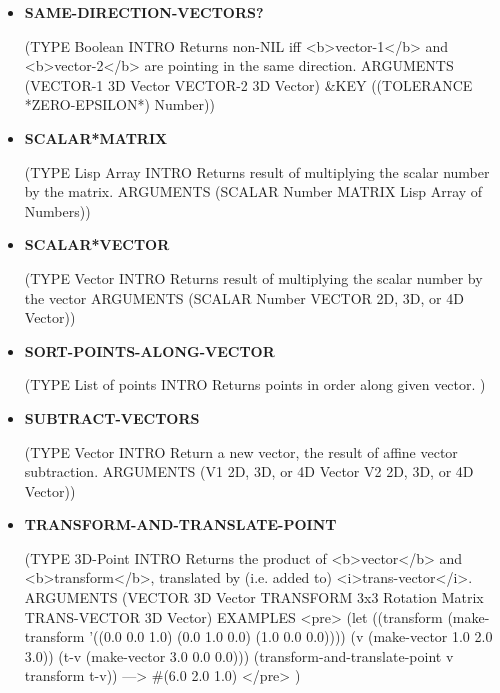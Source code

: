 \documentclass [11pt]{book}
\begin{document}
\begin{itemize}
\item {}
\label{prim:same-direction-vectors?}
\textbf{SAME-DIRECTION-VECTORS?}

(TYPE Boolean INTRO  Returns non-NIL iff <b>vector-1</b> and <b>vector-2</b> are pointing in the
same direction.
 ARGUMENTS (VECTOR-1 3D Vector VECTOR-2 3D Vector) \&KEY ((TOLERANCE *ZERO-EPSILON*) Number))



\item {}
\label{prim:scalar*matrix}
\textbf{SCALAR*MATRIX}

(TYPE Lisp Array INTRO  Returns result of multiplying the scalar number by the matrix.
 ARGUMENTS (SCALAR Number MATRIX Lisp Array of Numbers))



\item {}
\label{prim:scalar*vector}
\textbf{SCALAR*VECTOR}

(TYPE Vector INTRO  Returns result of multiplying the scalar number by the vector
 ARGUMENTS (SCALAR Number VECTOR 2D, 3D, or 4D Vector))



\item {}
\label{prim:sort-points-along-vector}
\textbf{SORT-POINTS-ALONG-VECTOR}

(TYPE List of points INTRO  Returns points in order along given vector.
)



\item {}
\label{prim:subtract-vectors}
\textbf{SUBTRACT-VECTORS}

(TYPE Vector INTRO  Return a new vector, the result of affine vector subtraction.
 ARGUMENTS (V1 2D, 3D, or 4D Vector V2 2D, 3D, or 4D Vector))



\item {}
\label{prim:transform-and-translate-point}
\textbf{TRANSFORM-AND-TRANSLATE-POINT}

(TYPE 3D-Point INTRO  Returns the product of <b>vector</b> and <b>transform</b>,
translated by (i.e. added to) <i>trans-vector</i>.
 ARGUMENTS (VECTOR 3D Vector TRANSFORM 3x3 Rotation Matrix TRANS-VECTOR 3D Vector) EXAMPLES 
<pre>
(let ((transform (make-transform '((0.0 0.0 1.0)
                                    (0.0 1.0 0.0)
                                    (1.0 0.0 0.0))))
       (v (make-vector 1.0 2.0 3.0))
       (t-v (make-vector 3.0 0.0 0.0)))
   (transform-and-translate-point v transform t-v))
 ---> \#(6.0 2.0 1.0)
</pre>
)




\end{itemize}
\end{document}
